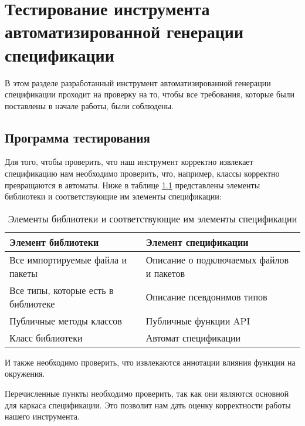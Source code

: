 \chapter{Тестирование инструмента автоматизированной генерации спецификации}

В этом разделе разработанный инструмент автоматизированной генерации спецификации проходит на проверку на то, чтобы все требования, которые были поставлены в начале работы, были соблюдены.

\section{Программа тестирования}

Для того, чтобы проверить, что наш инструмент корректно извлекает спецификацию нам необходимо проверить, что, например, классы корректно превращаются в автоматы.
Ниже в таблице \ref{tabular:second_tab} представлены элементы библиотеки и соответствующие им элементы спецификации:
\begin{table}[H]
	\caption{Элементы библиотеки и соответствующие им элементы спецификации}
	\begin{center}
		\begin{tabular}{|p{5.5cm}|p{5.5cm}|}
			\hline
			Элемент библиотеки & Элемент спецификации\\ \hline

			Все импортируемые файла и пакеты & Описание о подключаемых файлов и пакетов\\ \hline
			Все типы, которые есть в библиотеке & Описание псевдонимов типов\\ \hline
			Публичные методы классов & Публичные функции API\\ \hline
			Класс библиотеки & Автомат спецификации\\ \hline
		\end{tabular}
		\label{tabular:second_tab}
	\end{center}
\end{table}

И также необходимо проверить, что извлекаются аннотации влияния функции на окружения.

Перечисленные пункты необходимо проверить, так как они являются основной для каркаса спецификации.
Это позволит нам дать оценку корректности работы нашего инструмента.

